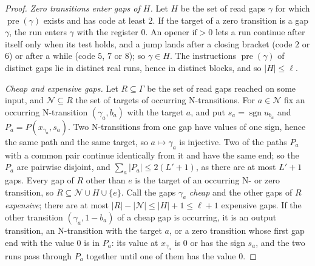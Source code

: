 \documentclass[11pt]{article}
\theoremstyle{remark}
\begin{document}
\begin{proof}
\emph{Zero transitions enter gaps of $H$.}  Let $H$ be the set of read gaps $\gamma$ for
which $\operatorname{pre}(\gamma)$ exists and has code at least $2$.  If the target of a
zero transition is a gap $\gamma$, the run enters $\gamma$ with the register $0$.  An
opener $\text{if}>0$ lets a run continue after itself only when its test holds, and a jump
lands after a closing bracket (code $2$ or $6$) or after a $\text{while}$ (code $5$, $7$ or
$8$); so $\gamma\in H$.  The instructions $\operatorname{pre}(\gamma)$ of distinct gaps lie
in distinct real runs, hence in distinct blocks, and so $|H|\le\ell$.

\emph{Cheap and expensive gaps.}  Let $R\subseteq\Gamma$ be the set of read gaps reached on
some input, and $\mathcal N\subseteq R$ the set of targets of occurring N-transitions.  For
$a\in\mathcal N$ fix an occurring N-transition $(\gamma_a,b_a)$ with the target $a$, and
put $s_a=\operatorname{sgn}u_{b_a}$ and $P_a=P(x_{\gamma_a},s_a)$.  Two N-transitions from
one gap have values of one sign, hence the same path and the same target, so
$a\mapsto\gamma_a$ is injective.  Two of the paths $P_a$ with a common pair continue
identically from it and have the same end; so the $P_a$ are pairwise disjoint, and
$\sum_a|P_a|\le2(L'+1)$, as there are at most $L'+1$ gaps.  Every gap of $R$ other than
$e$ is the target of an occurring N- or zero transition, so $R\subseteq\mathcal N\cup
H\cup\{e\}$.  Call the gaps $\gamma_a$ \emph{cheap} and the other gaps of $R$
\emph{expensive}; there are at most $|R|-|\mathcal N|\le|H|+1\le\ell+1$ expensive gaps.
If the other transition $(\gamma_a,1-b_a)$ of a cheap gap is occurring, it is an output
transition, an N-transition with the target $a$, or a zero transition whose first gap end
with the value $0$ is in $P_a$: its value at $x_{\gamma_a}$ is $0$ or has the sign $s_a$,
and the two runs pass through $P_a$ together until one of them has the value $0$.


\end{proof}
\end{document}

